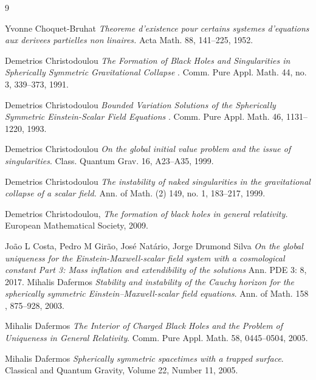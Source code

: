 \documentclass[10pt,a4paper]{article}
\theoremstyle{plain}
\theoremstyle{remark}
\theoremstyle{definition}
\theoremstyle{plain}
\theoremstyle{remark}
\theoremstyle{definition}
\numberwithin{equation}{section}
\begin{document}
\begin{thebibliography}{9}
	
	
	
	Yvonne Choquet-Bruhat  \emph{Theoreme d’existence pour certains systemes d'equations aux derivees partielles		non linaires.	}Acta Math. 88, 141–225, 1952.
	
	
	
	
	
	Demetrios Christodoulou \emph{The Formation of Black Holes and Singularities in
		Spherically Symmetric Gravitational Collapse
	}.
	Comm. Pure Appl. Math. 44, no. 3, 339–373, 1991.
	
	Demetrios Christodoulou \emph{Bounded Variation Solutions of the Spherically Symmetric Einstein-Scalar Field
		Equations
	}.
	Comm. Pure Appl. Math. 46, 1131–1220,  1993.
	
	Demetrios Christodoulou \emph{On the global initial value problem and the issue of singularities}.	Class. Quantum Grav. 16, A23–A35, 1999.
	
	Demetrios Christodoulou \emph{The instability of naked singularities in the gravitational collapse of a scalar
		field. 
	}
	Ann. of Math. (2) 149, no. 1, 183–217, 1999.
	
	
	Demetrios Christodoulou, \emph{The formation of black holes in general relativity.
	}
	European Mathematical Society, 2009.
	
	
	
	

Jo\~{a}o L Costa, Pedro M Gir\~{a}o, Jos\'{e} Nat\'{a}rio, Jorge Drumond Silva \emph{On the global uniqueness for the Einstein-Maxwell-scalar field system with a cosmological constant Part 3: Mass inflation and extendibility of the solutions}	Ann. PDE 3: 8, 2017.
	Mihalis Dafermos
	\emph{Stability and instability of the Cauchy
		horizon for the spherically symmetric
		Einstein--Maxwell-scalar field equations}.
	Ann. of Math. 158 , 875–928, 2003.
	
	
	
	Mihalis Dafermos
	\emph{The Interior of Charged Black Holes
		and the Problem of Uniqueness in General Relativity}.
	Comm. Pure Appl. Math. 58, 0445–0504, 2005.
	
	Mihalis Dafermos
	\emph{Spherically symmetric spacetimes with a trapped surface}. Classical and Quantum Gravity, Volume 22, Number 11, 2005.
	

\end{thebibliography}
\end{document}
